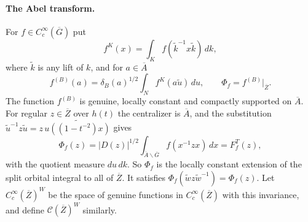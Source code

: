 \documentclass[12pt,letterpaper]{article}
\numberwithin{equation}{section}
\theoremstyle{definition}
\newcommand{\bG}{\overline{G}}
\newcommand{\bA}{\overline{A}}
\newcommand{\bZ}{\overline{Z}}
\newcommand{\wt}{\tilde w}
\newcommand{\calC}{\mathcal C}
\begin{document}
\paragraph{The Abel transform.}  For $f\in C_c^\infty(\bG)$ put
\begin{equation}\label{eq:fK}
f^{K}(x)=\int_{K}f(\tilde k^{-1}x\tilde k)\,dk,
\end{equation}
where $\tilde k$ is any lift of $k$, and for $a\in\bA$
\begin{equation}\label{eq:fB}
f^{(B)}(a)=\delta_B(a)^{1/2}\int_Nf^{K}(a\tilde u)\,du,\qquad \Phi_f=f^{(B)}|_{\bZ}.
\end{equation}
The function $f^{(B)}$ is genuine, locally constant and compactly supported on $\bA$.  For
regular $z\in\bZ$ over $h(t)$ the centralizer is $\bA$, and the substitution
$\tilde u^{-1}z\tilde u=z\,\widetilde{u((1-t^{-2})x)}$ gives
\begin{equation}\label{eq:Phi-orbital}
\Phi_f(z)=|D(z)|^{1/2}\int_{\bA\backslash\bG}f(x^{-1}zx)\,dx=F_f^{T}(z),
\end{equation}
with the quotient measure $du\,dk$.  So $\Phi_f$ is the locally constant extension of the
split orbital integral to all of $\bZ$.  It satisfies $\Phi_f(\wt z\wt^{-1})=\Phi_f(z)$.  Let
$C_c^\infty(\bZ)^W$ be the space of genuine functions in $C_c^\infty(\bZ)$ with this
invariance, and define $\calC(\bZ)^W$ similarly.
\end{document}
